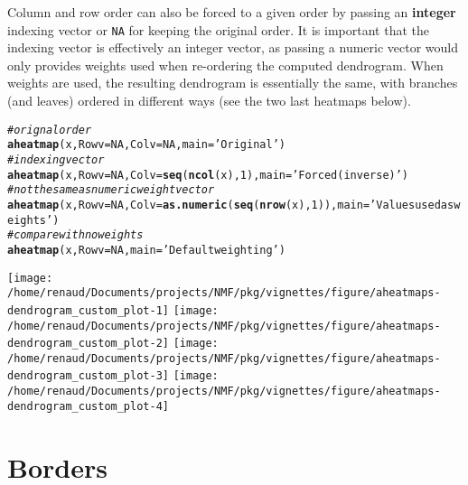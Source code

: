 \documentclass[a4paper]{article}\usepackage[]{graphicx}\usepackage[]{color}
\makeatletter
\newcommand{\hlnum}[1]{\textcolor[rgb]{0.686,0.059,0.569}{#1}}%
\newcommand{\hlstr}[1]{\textcolor[rgb]{0.192,0.494,0.8}{#1}}%
\newcommand{\hlcom}[1]{\textcolor[rgb]{0.678,0.584,0.686}{\textit{#1}}}%
\newcommand{\hlstd}[1]{\textcolor[rgb]{0.345,0.345,0.345}{#1}}%
\newcommand{\hlkwc}[1]{\textcolor[rgb]{0.333,0.667,0.333}{#1}}%
\newcommand{\hlkwd}[1]{\textcolor[rgb]{0.737,0.353,0.396}{\textbf{#1}}}%
\newenvironment{kframe}{%
 \def\at@end@of@kframe{}%
 \ifinner\ifhmode%
  \def\at@end@of@kframe{\end{minipage}}%
  \begin{minipage}{\columnwidth}%
 \fi\fi%
 \def\FrameCommand##1{\hskip\@totalleftmargin \hskip-\fboxsep
 \colorbox{shadecolor}{##1}\hskip-\fboxsep
     \hskip-\linewidth \hskip-\@totalleftmargin \hskip\columnwidth}%
 \MakeFramed {\advance\hsize-\width
   \@totalleftmargin\z@ \linewidth\hsize
   \@setminipage}}%
 {\par\unskip\endMakeFramed%
 \at@end@of@kframe}
\newenvironment{knitrout}{}{} %
\let\code=\texttt
\makeatother
\begin{document}
Column and row order can also be forced to a given order by passing an
\textbf{integer} indexing vector or \code{NA} for keeping the original order.
It is important that the indexing vector is effectively an integer
vector, as passing a numeric vector would only provides weights used
when re-ordering the computed dendrogram.
When weights are used, the resulting dendrogram is essentially the same, with
branches (and leaves) ordered in different ways (see the two last heatmaps
below).

\begin{knitrout}\small
{}\color{fgcolor}\begin{kframe}
\begin{alltt}
\hlcom{# orignal order}
\hlkwd{aheatmap}\hlstd{(x,} \hlkwc{Rowv} \hlstd{=} \hlnum{NA}\hlstd{,} \hlkwc{Colv} \hlstd{=} \hlnum{NA}\hlstd{,} \hlkwc{main} \hlstd{=} \hlstr{'Original'}\hlstd{)}
\hlcom{# indexing vector}
\hlkwd{aheatmap}\hlstd{(x,} \hlkwc{Rowv} \hlstd{=} \hlnum{NA}\hlstd{,} \hlkwc{Colv} \hlstd{=} \hlkwd{seq}\hlstd{(}\hlkwd{ncol}\hlstd{(x),} \hlnum{1}\hlstd{),} \hlkwc{main} \hlstd{=} \hlstr{'Forced (inverse)'}\hlstd{)}
\hlcom{# not the same as numeric weight vector}
\hlkwd{aheatmap}\hlstd{(x,} \hlkwc{Rowv} \hlstd{=} \hlnum{NA}\hlstd{,} \hlkwc{Colv} \hlstd{=} \hlkwd{as.numeric}\hlstd{(}\hlkwd{seq}\hlstd{(}\hlkwd{nrow}\hlstd{(x),} \hlnum{1}\hlstd{)),} \hlkwc{main} \hlstd{=} \hlstr{'Values used as weights'}\hlstd{)}
\hlcom{# compare with no weights}
\hlkwd{aheatmap}\hlstd{(x,} \hlkwc{Rowv} \hlstd{=} \hlnum{NA}\hlstd{,} \hlkwc{main} \hlstd{=} \hlstr{'Default weighting'}\hlstd{)}
\end{alltt}
\end{kframe}
\texttt{[image: /home/renaud/Documents/projects/NMF/pkg/vignettes/figure/aheatmaps-dendrogram\_custom\_plot-1]} 
\texttt{[image: /home/renaud/Documents/projects/NMF/pkg/vignettes/figure/aheatmaps-dendrogram\_custom\_plot-2]} 
\texttt{[image: /home/renaud/Documents/projects/NMF/pkg/vignettes/figure/aheatmaps-dendrogram\_custom\_plot-3]} 
\texttt{[image: /home/renaud/Documents/projects/NMF/pkg/vignettes/figure/aheatmaps-dendrogram\_custom\_plot-4]} 

\end{knitrout}

\section{Borders}
\end{document}
